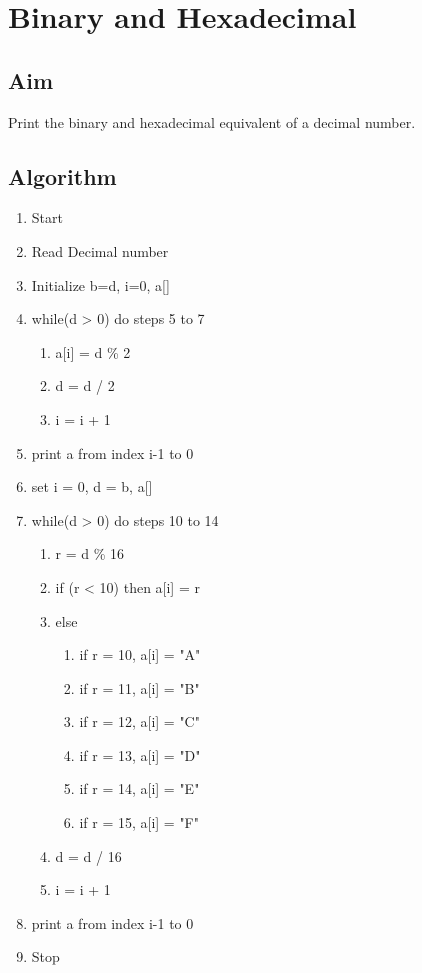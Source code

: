 \section{Binary and Hexadecimal}

\subsection{Aim}
Print the binary and hexadecimal equivalent of a decimal number.

\subsection{Algorithm}
\begin{enumerate}
   \item Start
   \item Read Decimal number
   \item Initialize b=d, i=0, a[]
   \item while(d > 0) do steps 5 to 7
       \begin{enumerate}
           \item a[i] = d \% 2
           \item d = d / 2
           \item i = i + 1
       \end{enumerate}
   \item print a from index i-1 to 0
   \item set i = 0, d = b, a[]
   \item while(d > 0) do steps 10 to 14
       \begin{enumerate}
           \item r = d \% 16
           \item if (r < 10) then a[i] = r
           \item else
               \begin{enumerate}
                   \item if r = 10, a[i] = "A"
                   \item if r = 11, a[i] = "B"
                   \item if r = 12, a[i] = "C"
                   \item if r = 13, a[i] = "D"
                   \item if r = 14, a[i] = "E"
                   \item if r = 15, a[i] = "F"
               \end{enumerate}
           \item d = d / 16
           \item i = i + 1
       \end{enumerate}
   \item print a from index i-1 to 0
   \item Stop
\end{enumerate}

